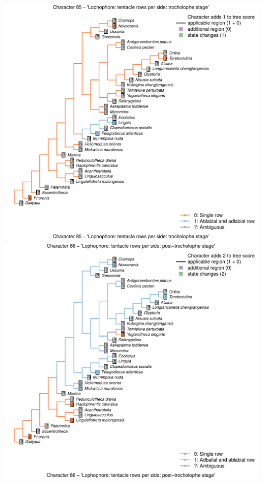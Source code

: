 \documentclass[]{book}
\theoremstyle{definition}
\theoremstyle{definition}
\theoremstyle{definition}
\theoremstyle{remark}
\begin{document}
\includegraphics{Brachiopod_phylogeny_files/figure-latex/unnamed-chunk-4-85.pdf}
\includegraphics{Brachiopod_phylogeny_files/figure-latex/unnamed-chunk-4-86.pdf}
\end{document}
